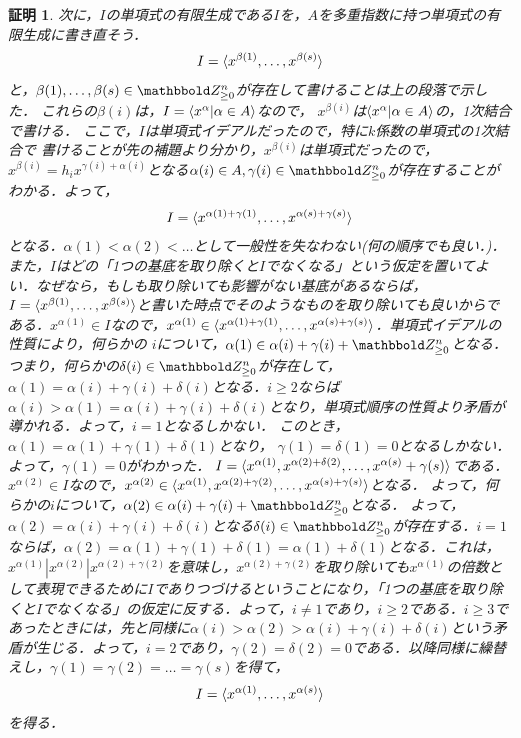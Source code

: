 \documentclass[9pt]{ltjsarticle}
\theoremstyle{break}
\theoremstyle{break}
\theoremstyle{break}
\theoremstyle{break}
\theoremstyle{break}
\theoremstyle{break}
\theoremstyle{break}
\theoremstyle{break}
\theoremstyle{break}
\theoremstyle{break}
\theoremstyle{break}
\theoremstyle{break}
\theoremstyle{break}
\theoremstyle{break}
\theoremstyle{break}
\theoremstyle{nonumberbreak}
\newtheorem{myproof}{証明}
\theoremstyle{nonumberbreak}
\begin{document}
\begin{myproof}
次に，$I$の単項式の有限生成である$I$を，$A$を多重指数に持つ単項式の有限生成に書き直そう．
\begin{align}
 I=\langle x^{\beta(1)},\dots,x^{\beta(s)} \rangle
\end{align}
と，$\beta(1),\dots,\beta(s)\in \Zge^n$が存在して書けることは上の段落で示した．
これらの$\beta(i)$は，$I=\langle x^\alpha | \alpha \in A \rangle$なので，
$x^{\beta(i)}$は$\langle x^{\alpha}|\alpha \in A \rangle$の，1次結合で書ける．
ここで，$I$は単項式イデアルだったので，特に$k$係数の単項式の1次結合で
書けることが先の補題より分かり，$x^{\beta(i)}$は単項式だったので，
$x^{\beta(i)}=h_i x^{\gamma(i)+\alpha(i)}$となる$\alpha(i)\in A, \gamma(i)\in \Zge^n$が存在することがわかる．よって，
\begin{align}
 I=\langle x^{\alpha(1)+\gamma(1)},\dots,x^{\alpha(s)+\gamma(s)} \rangle
\end{align}
となる．$\alpha(1)< \alpha(2)< \dots$として一般性を失なわない(何の順序でも良い．)．また，$I$はどの「1つの基底を取り除くと$I$でなくなる」という仮定を置いてよい．なぜなら，もしも取り除いても影響がない基底があるならば，$I=\langle x^{\beta(1)},\dots,x^{\beta(s)} \rangle$と書いた時点でそのようなものを取り除いても良いからである．$x^{\alpha(1)}\in I$なので，$x^{\alpha(1)}\in \langle x^{\alpha(1)+\gamma(1)},\dots,x^{\alpha(s)+\gamma(s)} \rangle$．単項式イデアルの性質により，何らかの
$i$について，$\alpha(1) \in \alpha(i)+\gamma(i) + \Zge^n$となる．
 つまり，何らかの$\delta(i)\in \Zge^n$が存在して，
$\alpha(1)=\alpha(i)+\gamma(i)+\delta(i)$となる．$i\ge 2$ならば
$\alpha(i)>\alpha(1)=\alpha(i)+\gamma(i)+\delta(i)$となり，単項式順序の性質より矛盾が導かれる．よって，$i=1$となるしかない．
 このとき，$\alpha(1)=\alpha(1)+\gamma(1)+\delta(1)$となり，
$\gamma(1)=\delta(1)=0$となるしかない．よって，$\gamma(1)=0$がわかった．
$I=\langle x^{\alpha(1)},x^{\alpha(2)+\delta(2)},\dots,x^{\alpha(s)}+\gamma(s) \rangle$である．$x^{\alpha(2)}\in I$なので，$x^{\alpha(2)}\in \langle x^{\alpha(1)},x^{\alpha(2)+\gamma(2)},\dots,x^{\alpha(s)+\gamma(s)} \rangle$となる．
よって，何らかの$i$について，$\alpha(2)\in \alpha(i) + \gamma(i)+\Zge^n$となる．
よって，$\alpha(2)=\alpha(i)+\gamma(i)+\delta(i)$となる$\delta(i)\in \Zge^n$が存在する．$i=1$ならば，$\alpha(2)=\alpha(1)+\gamma(1)+\delta(1)=\alpha(1)+\delta(1)$となる．これは，$x^{\alpha(1)}|x^{\alpha(2)}|x^{\alpha(2)+\gamma(2)}$を意味し，$x^{\alpha(2)+\gamma(2)}$を取り除いても$x^{\alpha(1)}$の倍数として表現できるために$I$でありつづけるということになり，「1つの基底を取り除くと$I$でなくなる」の仮定に反する．よって，$i\neq 1$であり，$i\ge 2$である．$i\ge 3$であったときには，先と同様に$\alpha(i)>\alpha(2)>\alpha(i)+\gamma(i)+\delta(i)$という矛盾が生じる．よって，$i=2$であり，$\gamma(2)=\delta(2)=0$である．以降同様に繰替えし，$\gamma(1)=\gamma(2)=\dots = \gamma(s)$を得て，
\begin{align}
 I=\langle x^{\alpha(1)},\dots,x^{\alpha(s)} \rangle
\end{align}
を得る．
\end{myproof}
\end{document}

